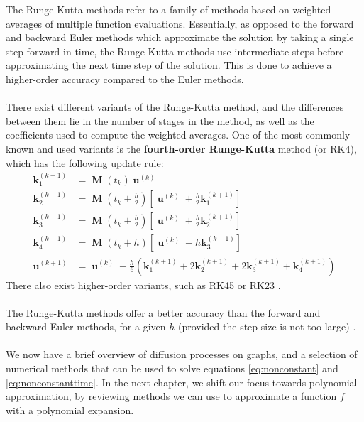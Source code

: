 \documentclass[12pt, oneside]{report}   	%
\DeclareMathOperator{\MM}{\boldsymbol{M}}
\DeclareMathOperator{\uu}{\boldsymbol{u}}
\begin{document}
The Runge-Kutta methods refer to a family of methods based on weighted averages of multiple function evaluations. Essentially, as opposed to the forward and backward Euler methods which approximate the solution by taking a single step forward in time, the Runge-Kutta methods use intermediate steps before approximating the next time step of the solution. This is done to achieve a higher-order accuracy compared to the Euler methods.\\\\
There exist different variants of the Runge-Kutta method, and the differences between them lie in the number of stages in the method, as well as the coefficients used to compute the weighted averages. One of the most commonly known and used variants is the \textbf{fourth-order Runge-Kutta} method (or RK4), which has the following update rule:
\begin{align*}
\boldsymbol{k}_1^{(k+1)} &= \MM(t_k)\uu^{(k)} \\
\boldsymbol{k}_2^{(k+1)} &= \MM(t_k+\frac{h}{2})[\uu^{(k)}+\frac{h}{2}\boldsymbol{k}_1^{(k+1)}] \\
\boldsymbol{k}_3^{(k+1)} &= \MM(t_k+\frac{h}{2})[\uu^{(k)}+\frac{h}{2}\boldsymbol{k}_2^{(k+1)}] \\
\boldsymbol{k}_4^{(k+1)} &= \MM(t_k+h)[\uu^{(k)}+h\boldsymbol{k}_3^{(k+1)}] \\
\uu^{(k+1)} &= \uu^{(k)} + \frac{h}{6}(\boldsymbol{k}_1^{(k+1)} + 2\boldsymbol{k}_2^{(k+1)} + 2\boldsymbol{k}_3^{(k+1)} + \boldsymbol{k}_4^{(k+1)})
\end{align*}
There also exist higher-order variants, such as RK45 or RK23 \cite{dormand1980family, shampine1986some, bogacki19893}.\\\\
The Runge-Kutta methods offer a better accuracy than the forward and backward Euler methods, for a given $h$ (provided the step size is not too large) \cite{burden2010numerical}.\\\\
We now have a brief overview of diffusion processes on graphs, and a selection of numerical methods that can be used to solve equations \eqref{eq:nonconstant} and \eqref{eq:nonconstanttime}. In the next chapter, we shift our focus towards polynomial approximation, by reviewing methods we can use to approximate a function $f$ with a polynomial expansion.
\end{document}

